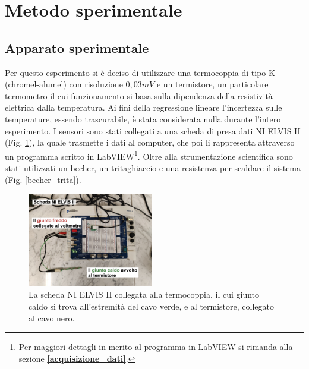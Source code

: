 \documentclass{article}
\begin{document}
\section{Metodo sperimentale}
\subsection{Apparato sperimentale}
Per questo esperimento si è deciso di utilizzare una termocoppia di tipo K (chromel-alumel) con risoluzione $0,03mV$ e un termistore, un particolare termometro il cui funzionamento si basa sulla dipendenza della resistività elettrica dalla temperatura. Ai fini della regressione lineare l'incertezza sulle temperature, essendo trascurabile, è stata considerata nulla durante l'intero esperimento. I sensori sono stati collegati a una scheda di presa dati NI ELVIS II (Fig. \ref{apparato_sperimentale}), la quale trasmette i dati al computer, che poi li rappresenta attraverso un programma scritto in LabVIEW\footnote{Per maggiori dettagli in merito al programma in LabVIEW si rimanda alla sezione \textbf{\ref{acquisizione_dati}}.}. Oltre alla strumentazione scientifica sono stati utilizzati un becher, un tritaghiaccio e una resistenza per scaldare il sistema (Fig. \ref{becher_trita}).

\begin{figure}[h!] %
\centering
\includegraphics[width=0.49\textwidth]{elvis}
\caption{La scheda NI ELVIS II collegata alla termocoppia, il cui giunto caldo si trova all'estremità del cavo verde, e al termistore, collegato al cavo nero.}
\label{apparato_sperimentale}
\end{figure}
\end{document}
